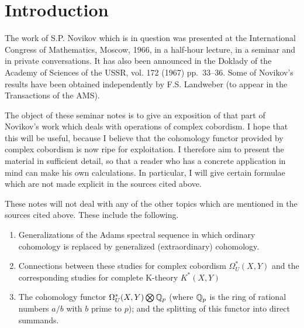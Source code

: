 \documentclass[../main]{subfiles}
\begin{document}
\label{sec:p1c1}

\chapter{Introduction}

The work of S.P. Novikov which is in question was presented at the International Congress of Mathematics, Moscow, 1966, in a half-hour lecture, in a seminar and in private conversations. It has also been announced in the Doklady of the Academy of Sciences of the USSR, vol. 172 (1967) pp.~33--36. Some of Novikov's results have been obtained independently by F.S. Landweber (to appear in the Transactions of the AMS).

The object of these seminar notes is to give an exposition of that part of Novikov's work which deals with operations of complex cobordism. I hope that this will be useful, because I believe that the cohomology functor provided by complex cobordism is now ripe for exploitation. I therefore aim to present the material in sufficient detail, so that a reader who has a concrete application in mind can make his own calculations. In particular, I will give certain formulae which are not made explicit in the sources cited above.

These notes will not deal with any of the other topics which are mentioned in the sources cited above. These include the following. \\[6pt]
\begin{enumerate}[label=(\roman*)] %
\item Generalizations of the Adams spectral sequence in which ordinary cohomology is replaced by generalized (extraordinary) cohomology.
\item Connections between these studies for complex cobordism $\Omega_U^* (X, Y)$ and the corresponding studies for complete K-theory $K^* (X, Y)$
\item The cohomology functor $\Omega_U^* (X, Y) \bigotimes \mathbb{Q}_p$ (where $\mathbb{Q}_p$ is the ring of rational numbers $a/b$ with $b$ prime to $p$); and the splitting of this functor into direct summands. %
\end{enumerate}
\end{document}
